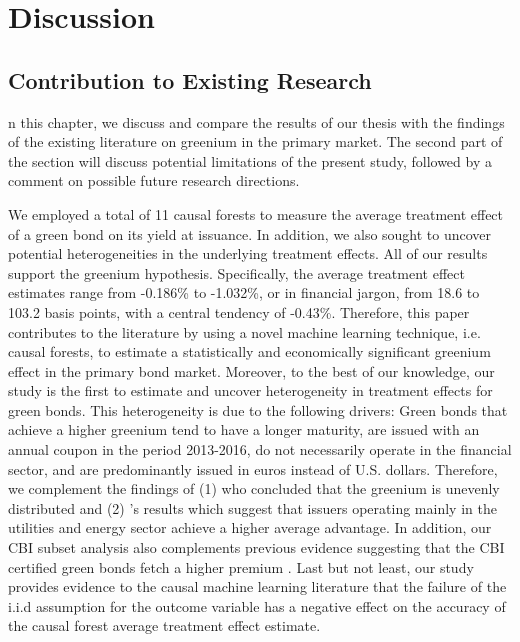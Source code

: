 %
%
\let\textcircled=\pgftextcircled
\chapter{Discussion}
\label{chap:intro}

\section{Contribution to Existing Research}

n this chapter, we discuss and compare the results of our thesis with the findings of the existing literature on greenium in the primary market. The second part of the section will discuss potential limitations of the present study, followed by a comment on possible future research directions.

We employed a total of 11 causal forests to measure the average treatment effect of a green bond on its yield at issuance. In addition, we also sought to uncover potential heterogeneities in the underlying treatment effects. All of our results support the greenium hypothesis. Specifically, the average treatment effect estimates range from -0.186\% to -1.032\%, or in financial jargon, from 18.6 to 103.2 basis points, with a central tendency of -0.43\%. Therefore, this paper contributes to the literature by using a novel machine learning technique, i.e. causal forests, to estimate a statistically and economically significant greenium effect in the primary bond market. Moreover, to the best of our knowledge, our study is the first to estimate and uncover heterogeneity in treatment effects for green bonds. This heterogeneity is due to the following drivers: Green bonds that achieve a higher greenium tend to have a longer maturity, are issued with an annual coupon in the period 2013-2016, do not necessarily operate in the financial sector, and are predominantly issued in euros instead of U.S. dollars. Therefore, we complement the findings of (1) \citet{caramichael2022green} who concluded that the greenium is unevenly distributed and (2) \citet{gianfrate2019green}'s results which suggest that issuers operating mainly in the utilities and energy sector achieve a higher average advantage. In addition, our CBI subset analysis also complements previous evidence suggesting that the CBI certified green bonds fetch a higher premium \citep{baker2018financing,fatica2021pricing}. Last but not least, our study provides evidence to the causal machine learning literature that the failure of the i.i.d assumption for the outcome variable has a negative effect on the accuracy of the causal forest average treatment effect estimate.

